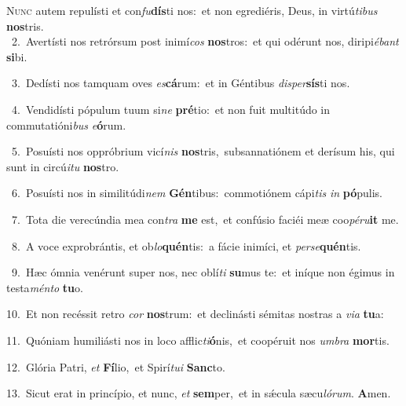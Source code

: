\lettrine{\initial\textcolor{\initialcolor}{N}}{unc} autem repulísti et con\-\textit{fu}\-\textbf{dís}ti nos:~\star et non egrediéris, Deus, in virtú\-\textit{ti}\-\textit{bus} \textbf{nos}\-tris.\\
{\numbfont\textcolor{\numbcolor}{~2.}}~Avertísti nos retrórsum post inimí\textit{cos} \textbf{nos}\-tros:~\star et qui odérunt nos, diripi\-\textit{é}\-\textit{bant} \textbf{si}\-bi.\par
{\numbfont\textcolor{\numbcolor}{~3.}}~Dedísti nos tamquam oves \textit{es}\-\textbf{cá}rum:~\star et in Géntibus \textit{di}\-\textit{sper}\textbf{sís}ti nos.\par
{\numbfont\textcolor{\numbcolor}{~4.}}~Vendidísti pópulum tuum si\textit{ne} \textbf{pré}\-tio:~\star et non fuit multitúdo in commutatióni\textit{bus} \textit{e}\-\textbf{ó}rum.\par
{\numbfont\textcolor{\numbcolor}{~5.}}~Posuísti nos oppróbrium vicí\textit{nis} \textbf{nos}\-tris,~\star subsannatiónem et derísum his, qui sunt in circú\-\textit{i}\-\textit{tu} \textbf{nos}\-tro.\par
{\numbfont\textcolor{\numbcolor}{~6.}}~Posuísti nos in similitúdi\textit{nem} \textbf{Gén}\-tibus:~\star commotiónem cápi\textit{tis} \textit{in} \textbf{pó}\-pulis.\par
{\numbfont\textcolor{\numbcolor}{~7.}}~Tota die verecúndia mea con\textit{tra} \textbf{me} est,~\star et confúsio faciéi meæ coo\-\textit{pé}\-\textit{ru}\textbf{it} me.\par
{\numbfont\textcolor{\numbcolor}{~8.}}~A voce exprobrántis, et ob\-\textit{lo}\-\textbf{quén}tis:~\star a fácie inimíci, et \textit{per}\-\textit{se}\textbf{quén}tis.\par
{\numbfont\textcolor{\numbcolor}{~9.}}~Hæc ómnia venérunt super nos, nec oblí\textit{ti} \textbf{su}\-mus te:~\star et iníque non égimus in testa\-\textit{mén}\-\textit{to} \textbf{tu}\-o.\par
{\numbfont\textcolor{\numbcolor}{10.}}~Et non recéssit retro \textit{cor} \textbf{nos}\-trum:~\star et declinásti sémitas nostras a \textit{vi}\-\textit{a} \textbf{tu}\-a:\par
{\numbfont\textcolor{\numbcolor}{11.}}~Quóniam humiliásti nos in loco afflic\-\textit{ti}\-\textbf{ó}nis,~\star et coopéruit nos \textit{um}\-\textit{bra} \textbf{mor}\-tis.\par
{\numbfont\textcolor{\numbcolor}{12.}}~Glória Patri, \textit{et} \textbf{Fí}\-lio,~\star et Spirí\-\textit{tu}\-\textit{i} \textbf{Sanc}\-to.\par
{\numbfont\textcolor{\numbcolor}{13.}}~Sicut erat in princípio, et nunc, \textit{et} \textbf{sem}\-per,~\star et in sǽcula sæcu\-\textit{ló}\-\textit{rum}. \textbf{A}\-men.\par

